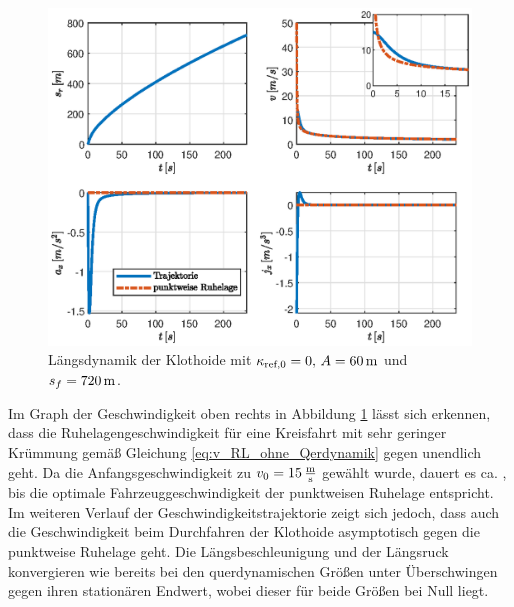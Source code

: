 \begin{figure}[h] 
	\centering
	\includegraphics[width=\linewidth]{./Bilder/Ergebnisse/Klothoide/svaj.eps}
	\caption{Längsdynamik der Klothoide mit $\kappa_{\textrm{ref},0} = 0,\, A = 60\,\mathrm{m}$ und $s_f = 720\,\mathrm{m}$.}
	\label{fig:svaj_klothoide}
\end{figure} 
Im Graph der Geschwindigkeit oben rechts in Abbildung \ref{fig:svaj_klothoide} lässt sich erkennen, dass die Ruhelagengeschwindigkeit für eine Kreisfahrt mit sehr geringer Krümmung gemäß Gleichung \eqref{eq:v_RL_ohne_Qerdynamik} gegen unendlich geht. Da die Anfangsgeschwindigkeit zu $v_0 = 15\,\mathrm{\frac{\mathrm{m}}{\mathrm{s}}}$ gewählt wurde, dauert es ca. , bis die optimale Fahrzeuggeschwindigkeit der punktweisen Ruhelage entspricht. Im weiteren Verlauf der Geschwindigkeitstrajektorie zeigt sich jedoch, dass auch die Geschwindigkeit beim Durchfahren der Klothoide asymptotisch gegen die punktweise Ruhelage geht. Die Längsbeschleunigung und der Längsruck konvergieren wie bereits bei den querdynamischen Größen unter Überschwingen gegen ihren stationären Endwert, wobei dieser für beide Größen bei Null liegt.

